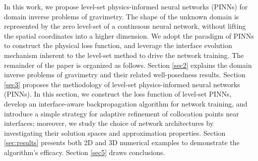 \documentclass[final,hidelinks,onefignum,onetabnum]{siamart251216}
\begin{document}
In this work, we propose level-set physics-informed neural networks (PINNs) for domain inverse problems of gravimetry. The shape of the unknown domain is represented by the zero level-set of a continuous neural network, without lifting the spatial coordinates into a higher dimension. We adopt the paradigm of PINNs to construct the physical loss function, and leverage the interface evolution mechanism inherent to the level-set method to drive the network training. The remainder of the paper is organized as follows. Section \ref{sec2} explains the domain inverse problems of gravimetry and their related well-posedness results. Section \ref{sec3} proposes the methodology of level-set physics-informed neural networks (PINNs). In this section, we construct the loss function of level-set PINNs, develop an interface-aware backpropagation algorithm for network training, and introduce a simple strategy for adaptive refinement of collocation points near interfaces; moreover, we study the choice of network architectures by investigating their solution spaces and approximation properties. Section \ref{sec:results} presents both 2D and 3D numerical examples to demonstrate the algorithm's efficacy. Section \ref{sec5} draws conclusions.
\end{document}
